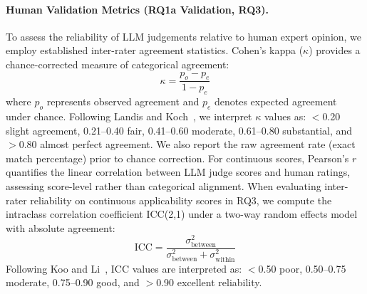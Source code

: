 \paragraph{Human Validation Metrics (RQ1a Validation, RQ3).}
To assess the reliability of LLM judgements relative to human expert opinion, we employ established inter-rater agreement statistics. Cohen's kappa ($\kappa$) provides a chance-corrected measure of categorical agreement:
\begin{equation}
    \kappa = \frac{p_o - p_e}{1 - p_e}
\end{equation}
where $p_o$ represents observed agreement and $p_e$ denotes expected agreement under chance. Following Landis and Koch~\cite{landis1977measurement}, we interpret $\kappa$ values as: $<$0.20 slight agreement, 0.21--0.40 fair, 0.41--0.60 moderate, 0.61--0.80 substantial, and $>$0.80 almost perfect agreement. We also report the raw agreement rate (exact match percentage) prior to chance correction. For continuous scores, Pearson's $r$ quantifies the linear correlation between LLM judge scores and human ratings, assessing score-level rather than categorical alignment. When evaluating inter-rater reliability on continuous applicability scores in RQ3, we compute the intraclass correlation coefficient ICC(2,1) under a two-way random effects model with absolute agreement:
\begin{equation}
    \text{ICC} = \frac{\sigma^2_{\text{between}}}{\sigma^2_{\text{between}} + \sigma^2_{\text{within}}}
\end{equation}
Following Koo and Li~\cite{koo2016guideline}, ICC values are interpreted as: $<$0.50 poor, 0.50--0.75 moderate, 0.75--0.90 good, and $>$0.90 excellent reliability.

